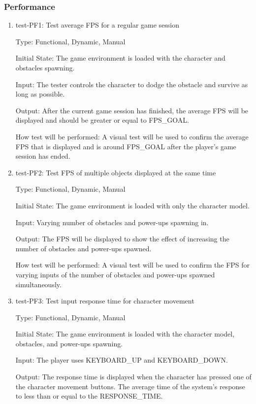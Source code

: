 \documentclass[12pt, titlepage]{article}
\begin{document}
\subsubsection{Performance}
\begin{enumerate}
\item{test-PF1: Test average FPS for a regular game session\\}

Type: Functional, Dynamic, Manual
					
Initial State: The game environment is loaded with the character and obstacles spawning.

Input: The tester controls the character to dodge the obstacle and survive as long as possible.
					
Output: After the current game session has finished, the average FPS will be displayed and should be greater or equal to FPS\_GOAL.
					
How test will be performed: A visual test will be used to confirm the average FPS that is displayed and is around FPS\_GOAL after the player's game session has ended. 

\item{test-PF2: Test FPS of multiple objects displayed at the same time\\}

Type: Functional, Dynamic, Manual
					
Initial State: The game environment is loaded with only the character model.

Input: Varying number of obstacles and power-ups spawning in.
					
Output: The FPS will be displayed to show the effect of increasing the number of obstacles and power-ups spawned.
					
How test will be performed: A visual test will be used to confirm the FPS for varying inputs of the number of obstacles and power-ups spawned simultaneously. 


\item{test-PF3: Test input response time for character movement\\}

Type: Functional, Dynamic, Manual
					
Initial State: The game environment is loaded with the character model, obstacles, and power-ups spawning.

Input: The player uses KEYBOARD\_UP and KEYBOARD\_DOWN.
					
Output: The response time is displayed when the character has pressed one of the character movement buttons. The average time of the system's response to less than or equal to the RESPONSE\_TIME.
					

\end{enumerate}
\end{document}

